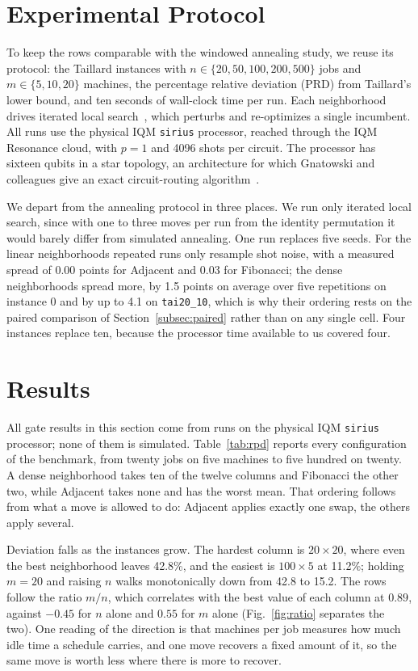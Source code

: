 \documentclass[runningheads]{llncs}
\begin{document}
\section{Experimental Protocol}
\label{sec:protocol}
To keep the rows comparable with the windowed annealing study, we reuse its
protocol: the Taillard instances with $n \in \{20, 50, 100, 200, 500\}$
jobs and $m \in \{5, 10, 20\}$ machines, the percentage relative deviation
(PRD) from Taillard's lower bound, and ten seconds of wall-clock time per run.
Each neighborhood drives iterated local search~\cite{lourenco2003}, which
perturbs and re-optimizes a single incumbent. All runs use the physical IQM \texttt{sirius} processor, reached through the IQM
Resonance cloud, with $p = 1$ and 4096 shots per circuit. The processor has
sixteen qubits in a star topology, an architecture for which Gnatowski and
colleagues give an exact circuit-routing algorithm~\cite{gnatowski2026routing}.

We depart from the annealing protocol in three places. We run only iterated
local search, since with one to three moves per run from the identity permutation it would
barely differ from simulated annealing. One run replaces five seeds. For the linear neighborhoods repeated runs only
resample shot noise, with a measured spread of 0.00 points for Adjacent and 0.03
for Fibonacci; the dense neighborhoods spread more, by 1.5 points on average over
five repetitions on instance 0 and by up to 4.1 on \texttt{tai20\_10}, which is
why their ordering rests on the paired comparison of
Section~\ref{subsec:paired} rather than on any single cell. Four instances replace ten, because the processor time
available to us covered four.

\section{Results}
\label{sec:results}
All gate results in this section come from runs on the physical IQM
\texttt{sirius} processor; none of them is simulated. Table~\ref{tab:rpd}
reports every configuration of the benchmark, from twenty
jobs on five machines to five hundred on twenty. A dense
neighborhood takes ten of the twelve columns and Fibonacci the other two, while
Adjacent takes none and has the worst mean. That ordering follows from what a move is allowed to do:
Adjacent applies exactly one swap, the others apply several.

Deviation falls as the instances grow. The hardest column is
$20\times20$, where even the best neighborhood leaves 42.8\%, and the easiest
is $100\times5$ at 11.2\%; holding $m = 20$ and raising $n$ walks
monotonically down from 42.8 to 15.2. The rows follow the ratio $m/n$, which correlates with the best value of each
column at $0.89$, against $-0.45$ for $n$ alone and $0.55$ for $m$ alone
(Fig.~\ref{fig:ratio} separates the two). One reading of the direction is that
machines per job measures how much idle time a schedule carries, and one move
recovers a fixed amount of it, so the same move is worth less where there is
more to recover.
\end{document}
